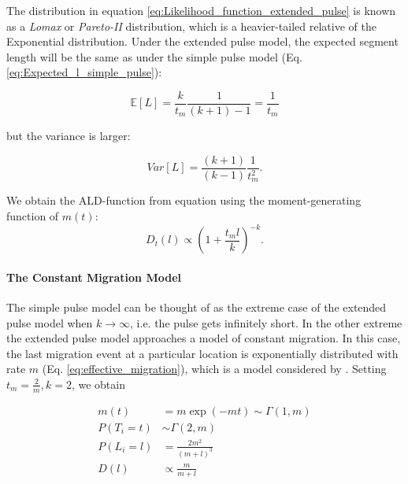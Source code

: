 \documentclass[11pt]{article}
\let\oldparagraph\paragraph
\renewcommand{\paragraph}[1]{\oldparagraph{#1}\mbox{}}
\begin{document}
The distribution  in equation \ref{eq:Likelihood_function_extended_pulse} is known as a \emph{Lomax} or \emph{Pareto-II} distribution, which is a heavier-tailed relative of the Exponential distribution. Under the extended pulse model, the expected segment length will be the same as under the simple pulse model (Eq. \ref{eq:Expected_l_simple_pulse}):
	
\begin{equation}
\label{eq:Expected_l_extended_pulse}
    \mathbb{E}[L] = \frac{k}{t_m}\frac{1}{(k+1)-1} = \frac{1}{t_{m}}
\end{equation}
	
	
but the variance is larger:
	

\begin{equation}
\label{eq:Var_l_extended_pulse}
	Var[L] = \frac{(k+1)}{(k-1)} \frac{1}{t_m^2}\text{.}
\end{equation}
	
We obtain the ALD-function from equation \label{eq:ld_general} using the  moment-generating function of $m(t)$:
\begin{equation}
\label{eq:extended_pulse_tail}
D_t(l) \propto  \left( 1 + \frac{t_m l}{k}\right)^{-k} \text{.}
\end{equation}

	
\paragraph{The Constant Migration Model}

The simple pulse model can be thought of as the extreme case of the extended pulse model when $k \to \infty$, i.e. the pulse gets infinitely short. In the  other extreme the extended pulse model approaches a model of constant migration. In this case, the last migration event at a particular location is exponentially distributed with rate $m$ (Eq. \ref{eq:effective_migration}), which is a model considered by \cite{pool_inference_2009}. 
Setting $t_m = \frac{2}{m}, k=2$, we obtain

\begin{subequations}
\begin{align}
    m(t) &= m \exp(-mt) \sim \Gamma(1, m)\\
    P(T_i=t) &\sim \Gamma\left(2, m\right)\\
	P(L_i=l) &= \frac{2m^2}{(m+l)^3}\label{eq:segments_continuous}\\
	D(l) &\propto \frac{m}{m + l}
\end{align}
\end{subequations}
	
\end{document}
